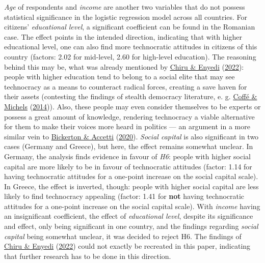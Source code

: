 \documentclass[
  12pt,
  english,
]{article}
\begin{document}
\emph{Age} of respondents and \emph{income} are another two variables
that do not possess statistical significance in the logistic regression
model across all countries. For citizens' \emph{educational level}, a
significant coefficient can be found in the Romanian case. The effect
points in the intended direction, indicating that with higher
educational level, one can also find more technocratic attitudes in
citizens of this country (factors: 2.02 for mid-level, 2.60 for
high-level education). The reasoning behind this may be, what was
already mentioned by \protect\hyperlink{ref-chiru2022wants}{Chiru \&
Enyedi} (\protect\hyperlink{ref-chiru2022wants}{2022}): people with
higher education tend to belong to a social elite that may see
technocracy as a means to counteract radical forces, creating a save
haven for their assets (contesting the findings of stealth democracy
literature, e. g. \protect\hyperlink{ref-coffe2014education}{Coffé \&
Michels} (\protect\hyperlink{ref-coffe2014education}{2014})). Also,
these people may even consider themselves to be experts or possess a
great amount of knowledge, rendering technocracy a viable alternative
for them to make their voices more heard in politics --- an argument in
a more similar vein to
\protect\hyperlink{ref-bickerton2020technocracy}{Bickerton \& Accetti}
(\protect\hyperlink{ref-bickerton2020technocracy}{2020}). \emph{Social
capital} is also significant in two cases (Germany and Greece), but
here, the effect remains somewhat unclear. In Germany, the analysis
finds evidence in favour of \emph{H6}: people with higher social capital
are more likely to be in favour of technocratic attitudes (factor: 1.14
for having technocratic attitudes for a one-point increase on the social
capital scale). In Greece, the effect is inverted, though: people with
higher social capital are less likely to find technocracy appealing
(factor: 1.41 for \textbf{not} having technocratic attitudes for a
one-point increase on the social capital scale). With \emph{income}
having an insignificant coefficient, the effect of \emph{educational
level}, despite its significance and effect, only being significant in
one country, and the findings regarding \emph{social capital} being
somewhat unclear, it was decided to reject H6. The findings of
\protect\hyperlink{ref-chiru2022wants}{Chiru \& Enyedi}
(\protect\hyperlink{ref-chiru2022wants}{2022}) could not exactly be
recreated in this paper, indicating that further research has to be done
in this direction.
\end{document}
